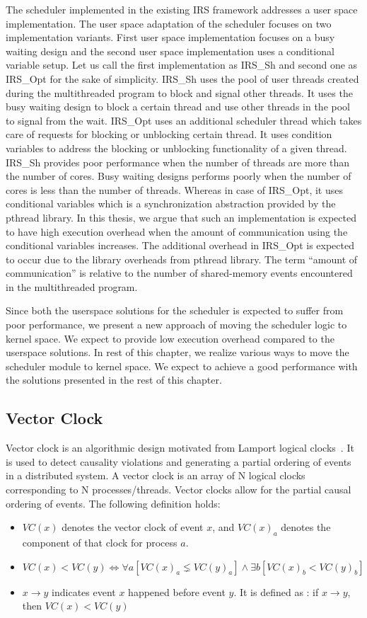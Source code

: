 The scheduler implemented in the existing IRS framework addresses a user space implementation. 
The user space adaptation of the scheduler focuses on two implementation variants. 
First user space implementation focuses on a busy waiting design and the second user space implementation uses a conditional variable setup. 
Let us call the first implementation as IRS\_Sh and second one as IRS\_Opt for the sake of simplicity. 
IRS\_Sh uses the pool of user threads created during the multithreaded program to block and signal other threads. 
It uses the busy waiting design to block a certain thread and use other threads in the pool to signal from the wait. 
IRS\_Opt uses an additional scheduler thread which takes care of requests for blocking or unblocking certain thread. 
It uses condition variables to address the blocking or unblocking functionality of a given thread. 
IRS\_Sh provides poor performance when the number of threads are more than the number of cores. 
Busy waiting designs performs poorly when the number of cores is less than the number of threads. 
Whereas in case of IRS\_Opt, it uses conditional variables which is a synchronization abstraction provided by the pthread library. 
In this thesis, we argue that such an implementation is expected to have high execution overhead when the amount of communication using the conditional variables increases. 
The additional overhead in IRS\_Opt is expected to occur due to the library overheads from pthread library. 
The term ``amount of communication'' is relative to the number of shared-memory events encountered in the multithreaded program. 

Since both the userspace solutions for the scheduler is expected to suffer from poor performance, we present a new approach of moving the scheduler logic to kernel space. 
We expect to provide low execution overhead compared to the userspace solutions. 
In rest of this chapter, we realize various ways to move the scheduler module to kernel space. 
We expect to achieve a good performance with the solutions presented in the rest of this chapter.

\subsection{Vector Clock \label{vec_clk}}

Vector clock is an algorithmic design motivated from Lamport logical clocks~\citep{fidge1991logical}. 
It is used to detect causality violations and generating a partial ordering of events in a distributed system. 
A vector clock is an array of N logical clocks corresponding to N processes/threads. 
Vector clocks allow for the partial causal ordering of events.
The following definition holds:
\begin{itemize}
\item $VC(x)$ denotes the vector clock of event $x$, and $VC(x)_a$ denotes the component of that clock for process $a$. 
\item $VC(x) < VC(y) \iff \forall a[VC(x)_a \lneq VC(y)_a] \wedge \exists b[VC(x)_b < VC(y)_b]$
\item $x \to y$ indicates event $x$ happened before event $y$. It is defined as : if $x \to y$, then $VC(x) < VC(y)$
\end{itemize}

